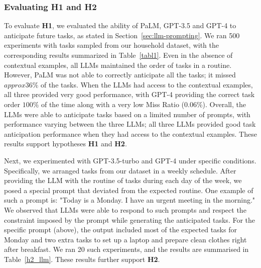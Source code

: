 \subsubsection{Evaluating H1 and H2}
To evaluate \textbf{H1}, we evaluated the ability of PaLM, GPT-3.5 and GPT-4 to anticipate future tasks, as stated in Section~\ref{sec:llm-prompting}. We ran 500 experiments with tasks sampled from our household dataset, with the corresponding results summarized in Table~\ref{tabl1}. Even in the absence of contextual examples, all LLMs maintained the order of tasks in a routine. However, PaLM was not able to correctly anticipate all the tasks; it missed $approx 36\%$ of the tasks. When the LLMs had access to the contextual examples, all three provided very good performance, with GPT-4 providing the correct task order $100\%$ of the time along with a very low Miss Ratio (0.06\%). Overall, the LLMs were able to anticipate tasks based on a limited number of prompts, with performance varying between the three LLMs; all three LLMs provided good task anticipation performance when they had access to the contextual examples. %
These results support hypotheses \textbf{H1} and \textbf{H2}.

Next, we experimented with GPT-3.5-turbo and GPT-4 under specific conditions. Specifically, we arranged tasks from our dataset in a weekly schedule.
After providing the LLM with the routine of tasks during each day of the week, we posed a special prompt that deviated from the expected routine. One example of such a prompt is: "Today is a Monday. I have an urgent meeting in the morning." We observed that
LLMs were able to respond to such prompts and respect the constraint imposed by the prompt while generating the anticipated tasks. For the specific prompt (above), the output included most of the expected tasks for Monday and two extra tasks to set up a laptop and prepare clean clothes right after breakfast. We ran 20 such experiments, and the results are summarised in Table~\ref{h2_llm}. These results further support \textbf{H2}.


